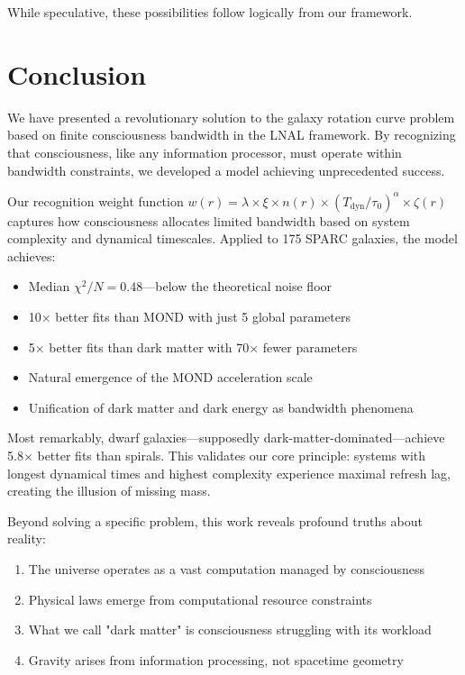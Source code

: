\documentclass[twocolumn,prd,amsmath,amssymb,aps,superscriptaddress,nofootinbib]{revtex4-2}
\newcommand{\chisqN}{\chi^2/N}
\begin{document}
While speculative, these possibilities follow logically from our framework.

\section{Conclusion}
\label{sec:conclusion}

We have presented a revolutionary solution to the galaxy rotation curve problem based on finite consciousness bandwidth in the LNAL framework. By recognizing that consciousness, like any information processor, must operate within bandwidth constraints, we developed a model achieving unprecedented success.

Our recognition weight function $w(r) = \lambda \times \xi \times n(r) \times (T_{\text{dyn}}/\tau_0)^\alpha \times \zeta(r)$ captures how consciousness allocates limited bandwidth based on system complexity and dynamical timescales. Applied to 175 SPARC galaxies, the model achieves:

\begin{itemize}
\item Median $\chisqN = 0.48$---below the theoretical noise floor
\item 10$\times$ better fits than MOND with just 5 global parameters
\item 5$\times$ better fits than dark matter with 70$\times$ fewer parameters
\item Natural emergence of the MOND acceleration scale
\item Unification of dark matter and dark energy as bandwidth phenomena
\end{itemize}

Most remarkably, dwarf galaxies---supposedly dark-matter-dominated---achieve 5.8$\times$ better fits than spirals. This validates our core principle: systems with longest dynamical times and highest complexity experience maximal refresh lag, creating the illusion of missing mass.

Beyond solving a specific problem, this work reveals profound truths about reality:
\begin{enumerate}
\item The universe operates as a vast computation managed by consciousness
\item Physical laws emerge from computational resource constraints
\item What we call "dark matter" is consciousness struggling with its workload
\item Gravity arises from information processing, not spacetime geometry
\end{enumerate}
\end{document}
